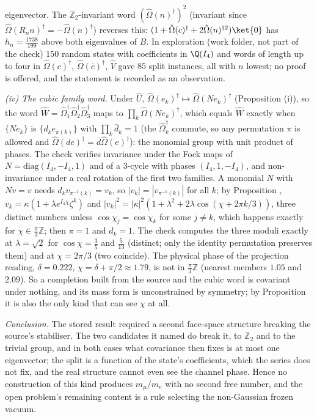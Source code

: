 eigenvector. The $\mathbb{Z}_{2}$-invariant word $(\hat\Omega(n)^{\dagger})^{2}$ (invariant since $\hat\Omega(R_{n}n)^{\dagger} = -\hat\Omega(n)^{\dagger}$) reverses this: $(1 + \hat\Omega(c)^{\dagger} + 2\hat\Omega(n)^{\dagger 2})\ket{0}$ has $h_{n} = \tfrac{1738}{199}$ above both eigenvalues of $B$. In exploration (work folder, not part of the check) $150$ random states with coefficients in $\Q(I_4)$ and words of length up to four in $\hat\Omega(c)^{\dagger}$, $\hat\Omega(\bar{c})^{\dagger}$, $\hat{V}$ gave $85$ split instances, all with $n$ lowest; no proof is offered, and the statement is recorded as an observation.

\emph{(iv) The cubic family word.} Under $\hat{U}$, $\hat\Omega(e_{k})^{\dagger} \mapsto \hat\Omega(Ne_{k})^{\dagger}$ (Proposition (i)), so the word $\hat{W} = \hat\Omega_{1}^{\dagger}\hat\Omega_{2}^{\dagger}\hat\Omega_{3}^{\dagger}$ maps to $\prod_{k}\hat\Omega(Ne_{k})^{\dagger}$, which equals $\hat{W}$ exactly when $\{Ne_{k}\}$ is $\{d_{k}e_{\pi(k)}\}$ with $\prod_{k}\bar{d}_{k} = 1$ (the $\hat\Omega_{k}^{\dagger}$ commute, so any permutation $\pi$ is allowed and $\hat\Omega(de)^{\dagger} = \bar{d}\hat\Omega(e)^{\dagger}$): the monomial group with unit product of phases. The check verifies invariance under the Fock maps of $N = \mathrm{diag}(I_4, -I_4, 1)$ and of a $3$-cycle with phases $(I_4, 1, -I_4)$, and non-invariance under a real rotation of the first two families. A monomial $N$ with $Nv = v$ needs $d_{k}v_{\pi^{-1}(k)} = v_{k}$, so $|v_{k}| = |v_{\pi^{-1}(k)}|$ for all $k$; by Proposition , $v_{k} = \kappa(1 + \lambda e^{I_4\chi}\zeta^{k})$ and $|v_{k}|^{2} = |\kappa|^{2}(1 + \lambda^{2} + 2\lambda\cos(\chi + 2\pi k/3))$, three distinct numbers unless $\cos\chi_{j} = \cos\chi_{k}$ for some $j \ne k$, which happens exactly for $\chi \in \tfrac{\pi}{3}\mathbb{Z}$; then $\pi = 1$ and $d_{k} = 1$. The check computes the three moduli exactly at $\lambda = \sqrt2$ for $\cos\chi = \tfrac35$ and $\tfrac5{13}$ (distinct; only the identity permutation preserves them) and at $\chi = 2\pi/3$ (two coincide). The physical phase of the projection reading, $\delta = 0.222$, $\chi = \delta + \pi/2 \approx 1.79$, is not in $\tfrac{\pi}{3}\mathbb{Z}$ (nearest members $1.05$ and $2.09$). So a completion built from the source and the cubic word is covariant under nothing, and its mass form is unconstrained by symmetry; by Proposition  it is also the only kind that can see $\chi$ at all.

\emph{Conclusion.} The stored result required a second face-space structure breaking the source's stabiliser. The two candidates it named do break it, to $\mathbb{Z}_{2}$ and to the trivial group, and in both cases what covariance then fixes is at most one eigenvector; the split is a function of the state's coefficients, which the series does not fix, and the real structure cannot even see the channel phase. Hence no construction of this kind produces $m_{\mu}/m_{e}$ with no second free number, and the open problem's remaining content is a rule selecting the non-Gaussian frozen vacuum.
